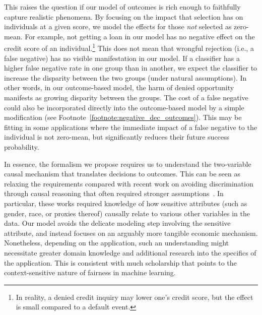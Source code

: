 This raises the question if our model of outcomes is rich enough to faithfully
capture realistic phenomena.  By focusing on the impact that selection has on
individuals at a given score, we model the effects for those \emph{not} selected
as zero-mean. For example, not getting a loan in our model has no negative
effect on the credit score of an individual.\footnote{In reality, a denied
credit inquiry may lower one's credit score, but the effect is small compared to
a default event.} This does not mean that wrongful rejection (i.e., a false
negative) has no visible manifestation in our model. If a classifier has a
higher false negative rate in one group than in another, we expect the
classifier to increase the disparity between the two groups (under natural
assumptions). In other words, in our outcome-based model, the harm of denied
opportunity manifests as growing disparity between the groups.  The cost of a
false negative could also be incorporated directly into the outcome-based model by a simple modification (see
Footnote~\ref{footnote:negative_dec_outcomes}). This may be fitting in some
applications where the immediate impact of a false negative to the individual is
not zero-mean, but significantly reduces their future success probability.

In essence, the formalism we propose requires us to understand the two-variable
causal mechanism that translates decisions to outcomes.  This can be seen as
relaxing the requirements compared with recent work 
on avoiding discrimination through causal reasoning that often required stronger
assumptions~\citep{Kusner17,Nabi17,Kilbertus17}. In particular, these works required knowledge of how
sensitive attributes (such as gender, race, or proxies thereof) causally relate
to various other variables in the data. Our model avoids the delicate modeling
step involving the sensitive attribute, and instead focuses on an arguably more
tangible economic mechanism. Nonetheless, depending on the application, such an
understanding might necessitate greater domain knowledge and additional research
into the specifics of the application. This is consistent with much scholarship
that points to the context-sensitive nature of fairness in machine learning. 

